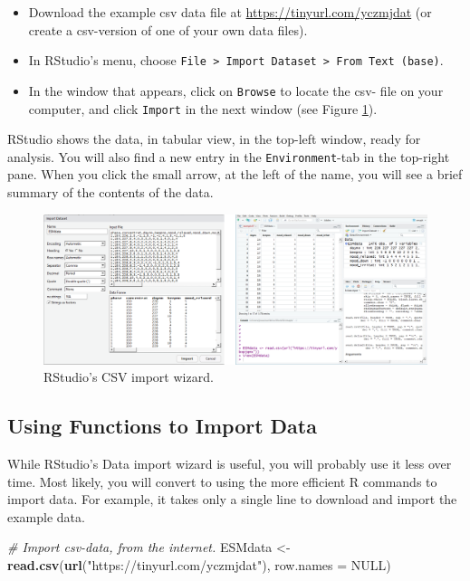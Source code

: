 \documentclass[]{book}
\newenvironment{Shaded}{\begin{snugshade}}{\end{snugshade}}
\newcommand{\KeywordTok}[1]{\textcolor[rgb]{0.13,0.29,0.53}{\textbf{#1}}}
\newcommand{\DataTypeTok}[1]{\textcolor[rgb]{0.13,0.29,0.53}{#1}}
\newcommand{\StringTok}[1]{\textcolor[rgb]{0.31,0.60,0.02}{#1}}
\newcommand{\CommentTok}[1]{\textcolor[rgb]{0.56,0.35,0.01}{\textit{#1}}}
\newcommand{\OtherTok}[1]{\textcolor[rgb]{0.56,0.35,0.01}{#1}}
\newcommand{\NormalTok}[1]{#1}
\begin{document}
\begin{itemize}
\item
  Download the example csv data file at
  \url{https://tinyurl.com/yczmjdat} (or create a csv-version of one of
  your own data files).
\item
  In RStudio's menu, choose
  \texttt{File\ \textgreater{}\ Import\ Dataset\ \textgreater{}\ From\ Text\ (base)}.
\item
  In the window that appears, click on \texttt{Browse} to locate the
  csv- file on your computer, and click \texttt{Import} in the next
  window (see Figure \ref{fig:r-import}).
\end{itemize}

RStudio shows the data, in tabular view, in the top-left window, ready
for analysis. You will also find a new entry in the
\texttt{Environment}-tab in the top-right pane. When you click the small
arrow, at the left of the name, you will see a brief summary of the
contents of the data.

\begin{figure}

{\centering \includegraphics[width=0.98\linewidth]{images/R/csv_import} 

}

\caption{RStudio's CSV import wizard.}\label{fig:r-import}
\end{figure}

\subsection{Using Functions to Import
Data}\label{using-functions-to-import-data}

While RStudio's Data import wizard is useful, you will probably use it
less over time. Most likely, you will convert to using the more
efficient R commands to import data. For example, it takes only a single
line to download and import the example data.

\begin{Shaded}
\begin{Highlighting}[]
\CommentTok{# Import csv-data, from the internet.}
\NormalTok{ESMdata <-}\StringTok{ }\KeywordTok{read.csv}\NormalTok{(}\KeywordTok{url}\NormalTok{(}\StringTok{"https://tinyurl.com/yczmjdat"}\NormalTok{), }\DataTypeTok{row.names =} \OtherTok{NULL}\NormalTok{)}
\end{Highlighting}
\end{Shaded}
\end{document}

